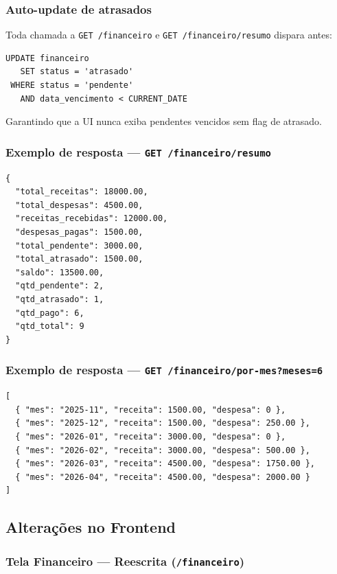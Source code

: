 \documentclass[12pt, a4paper]{article}
\begin{document}
\subsubsection{Auto-update de atrasados}

Toda chamada a \texttt{GET /financeiro} e \texttt{GET /financeiro/resumo} dispara antes:

\begin{lstlisting}[language=SQL2]
UPDATE financeiro
   SET status = 'atrasado'
 WHERE status = 'pendente'
   AND data_vencimento < CURRENT_DATE
\end{lstlisting}

Garantindo que a UI nunca exiba pendentes vencidos sem flag de atrasado.

\subsubsection{Exemplo de resposta — \texttt{GET /financeiro/resumo}}

\begin{lstlisting}[language=JavaScript2]
{
  "total_receitas": 18000.00,
  "total_despesas": 4500.00,
  "receitas_recebidas": 12000.00,
  "despesas_pagas": 1500.00,
  "total_pendente": 3000.00,
  "total_atrasado": 1500.00,
  "saldo": 13500.00,
  "qtd_pendente": 2,
  "qtd_atrasado": 1,
  "qtd_pago": 6,
  "qtd_total": 9
}
\end{lstlisting}

\subsubsection{Exemplo de resposta — \texttt{GET /financeiro/por-mes?meses=6}}

\begin{lstlisting}[language=JavaScript2]
[
  { "mes": "2025-11", "receita": 1500.00, "despesa": 0 },
  { "mes": "2025-12", "receita": 1500.00, "despesa": 250.00 },
  { "mes": "2026-01", "receita": 3000.00, "despesa": 0 },
  { "mes": "2026-02", "receita": 3000.00, "despesa": 500.00 },
  { "mes": "2026-03", "receita": 4500.00, "despesa": 1750.00 },
  { "mes": "2026-04", "receita": 4500.00, "despesa": 2000.00 }
]
\end{lstlisting}

\subsection{Alterações no Frontend}

\subsubsection{Tela Financeiro — Reescrita (\texttt{/financeiro})}
\end{document}

